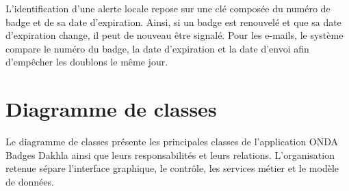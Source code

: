 \documentclass[12pt,a4paper,openany]{report}
\begin{document}
L'identification d'une alerte locale repose sur une clé composée du numéro de
badge et de sa date d'expiration. Ainsi, si un badge est renouvelé et que sa date
d'expiration change, il peut de nouveau être signalé. Pour les e-mails, le
système compare le numéro du badge, la date d'expiration et la date d'envoi afin
d'empêcher les doublons le même jour.

\section{Diagramme de classes}

Le diagramme de classes présente les principales classes de l'application
ONDA Badges Dakhla ainsi que leurs responsabilités et leurs relations.
L'organisation retenue sépare l'interface graphique, le contrôle, les services
métier et le modèle de données.
\end{document}
